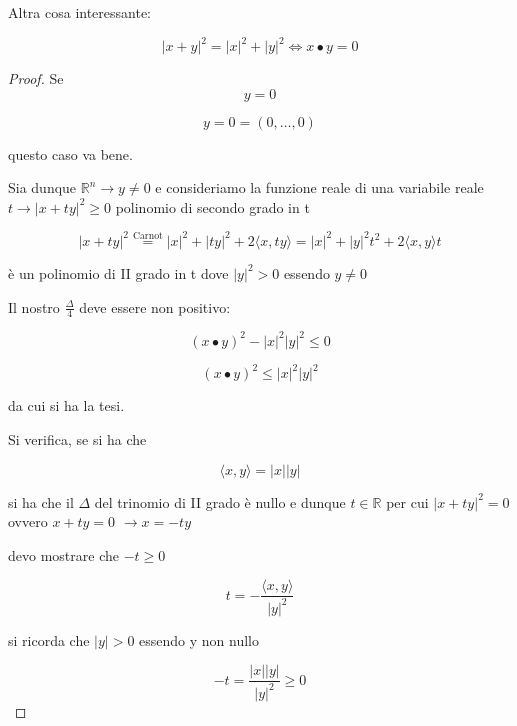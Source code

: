 \documentclass[../appunti-analisi.tex]{subfiles}
\begin{document}
Altra cosa interessante:

 \[
    |x+y|^{2}= |x|^{2} + |y|^{2} \Leftrightarrow x\bullet y  =0
 \]




 \begin{proof}
     Se
     \[
        y=0
     \]

     \[
         y=0=(0, \ldots ,0) 
     \]
     
     questo caso va bene.

     Sia dunque $\mathbb{R}^{n} \rightarrow y \neq 0$ e consideriamo la funzione reale di una variabile reale $t \rightarrow |x+ty|^{2}\ge 0$ polinomio di secondo grado in t

     \[
         |x + ty| ^{2} \overset{\text{Carnot}}{=} |x|^{2} + |ty|^{2} + 2\langle x,ty \rangle  = |x|^{2} + |y|^{2}t^{2} + 2 \langle x,y \rangle t
     \]

     è un polinomio di II grado in t dove $|y|^{2}> 0 $ essendo $y \neq 0$

     Il nostro $\frac{\Delta}{4}$ deve essere non positivo:

     \[
         (x\bullet y ) ^{2} - |x| ^{2}|y|^{2} \le 0
     \]

     \[
         (x\bullet y ) ^{2}\le  |x| ^{2}|y|^{2} 
     \]

     da cui si ha la tesi.

     Si verifica, se si ha che

     \[
         \langle x,y \rangle = |x| |y|
     \]

     si ha che il $\Delta$ del trinomio di II grado è nullo e dunque $t \in \mathbb{R}$ per cui $|x+ty|^{2}=0$ ovvero $x +ty=0$ $\rightarrow x=-ty$

     devo mostrare che $-t \ge 0$


     \[
         t = - \frac{\langle x,y \rangle}{|y|^{2}}
     \]

     si ricorda che $|y|>0$ essendo y non nullo

     \[
         -t = \frac{|x| |y|}{|y|^{2}}\ge 0
     \]

 \end{proof}
\end{document}
